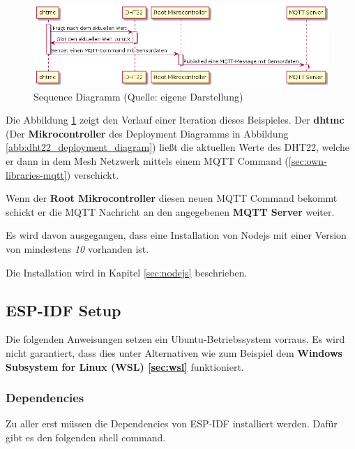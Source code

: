 \vspace*{50px}
\begin{figure}[H]
    \begin{center}
        \includegraphics[scale=.5]{diagrams/mqtt_dht22_example_sequence.png}
        \caption{Sequence Diagramm (Quelle: eigene Darstellung)}
        \label{abb:dht22_sequence_diagram}
    \end{center}
\end{figure}
\vspace*{50px}

Die Abbildung \ref{abb:dht22_sequence_diagram} zeigt den Verlauf einer Iteration dieses Beispieles.
Der \textbf{dhtmc} (Der \textbf{Mikrocontroller} des Deployment Diagramms in Abbildung \ref{abb:dht22_deployment_diagram}) ließt die aktuellen Werte des DHT22, welche er dann in dem Mesh Netzwerk mittels einem MQTT Command (\ref{sec:own-libraries-mqtt}) verschickt.

Wenn der \textbf{Root Mikrocontroller} diesen neuen MQTT Command bekommt schickt er die MQTT Nachricht an den angegebenen \textbf{MQTT Server} weiter.

Es wird davon ausgegangen, dass eine Installation von Nodejs mit einer Version von mindestens \textit{10} vorhanden ist.

Die Installation wird in Kapitel \ref{sec:nodejs} beschrieben.

\subsection{ESP-IDF Setup}

Die folgenden Anweisungen setzen ein Ubuntu-Betriebssystem vorraus. Es wird nicht garantiert, dass dies unter Alternativen wie zum Beispiel dem \textbf{Windows Subsystem for Linux (WSL) \ref{sec:wsl}} funktioniert. 

\subsubsection{Dependencies}

Zu aller erst müssen die Dependencies von ESP-IDF installiert werden. Dafür gibt es den folgenden shell command.

